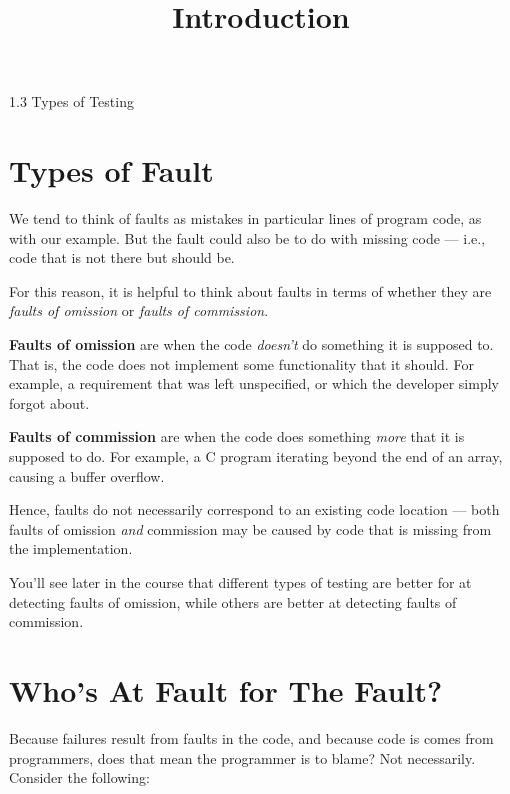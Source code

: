 



\title{Introduction}{1.3 Types of Testing}

\section{Types of Fault}


We tend to think of faults as mistakes in particular lines of program code, as
with our example. But the fault could also be to do with missing code --- i.e.,
code that is not there but should be. 

For this reason, it is helpful to think about faults in terms of whether they
are {\it faults of omission} or {\it faults of commission}. 


{\bf Faults of omission} are when the code {\it doesn't} do something it is
supposed to. That is, the code does not implement some functionality that it
should. For example, a requirement that was left unspecified, or which the
developer simply forgot about. 

{\bf Faults of commission} are when the code does something {\it more} that it
is supposed to do. For example, a C program iterating beyond the end of an
array, causing a buffer overflow. 

Hence, faults do not necessarily correspond to an existing code location ---
both faults of omission {\it and} commission may be caused by code that is
missing from the implementation. 

You'll see later in the course that different types of testing are better for at
detecting faults of omission, while others are better at detecting faults of
commission. 


\section{Who's At Fault for The Fault?}


Because failures result from faults in the code, and because code is comes from
programmers, does that mean the programmer is to blame? Not necessarily.
Consider the following:

